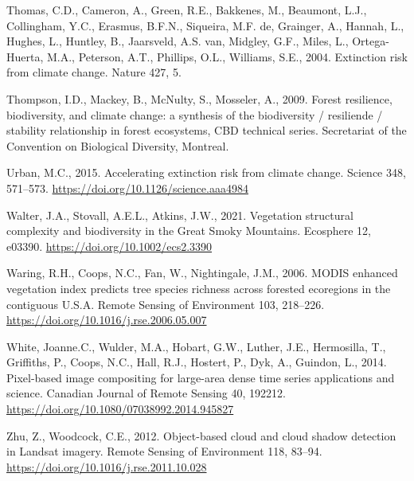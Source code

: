 \documentclass[
]{agujournal2019}
\newlength{\cslhangindent}
\newenvironment{CSLReferences}[2] %
 {\begin{list}{}{%
  \setlength{\itemindent}{0pt}
  \setlength{\leftmargin}{0pt}
  \setlength{\parsep}{0pt}
  \ifodd #1
   \setlength{\leftmargin}{\cslhangindent}
   \setlength{\itemindent}{-1\cslhangindent}
  \fi
  \setlength{\itemsep}{#2\baselineskip}}}
 {\end{list}}
\begin{document}
\begin{CSLReferences}{1}{0}
Thomas, C.D., Cameron, A., Green, R.E., Bakkenes, M., Beaumont, L.J.,
Collingham, Y.C., Erasmus, B.F.N., Siqueira, M.F. de, Grainger, A.,
Hannah, L., Hughes, L., Huntley, B., Jaarsveld, A.S. van, Midgley, G.F.,
Miles, L., Ortega-Huerta, M.A., Peterson, A.T., Phillips, O.L.,
Williams, S.E., 2004. Extinction risk from climate change. Nature 427,
5.

Thompson, I.D., Mackey, B., McNulty, S., Mosseler, A., 2009. Forest
resilience, biodiversity, and climate change: a synthesis of the
biodiversity / resiliende / stability relationship in forest ecosystems,
CBD technical series. Secretariat of the Convention on Biological
Diversity, Montreal.

Urban, M.C., 2015. Accelerating extinction risk from climate change.
Science 348, 571--573. \url{https://doi.org/10.1126/science.aaa4984}

Walter, J.A., Stovall, A.E.L., Atkins, J.W., 2021. Vegetation structural
complexity and biodiversity in the Great Smoky Mountains. Ecosphere 12,
e03390. \url{https://doi.org/10.1002/ecs2.3390}

Waring, R.H., Coops, N.C., Fan, W., Nightingale, J.M., 2006. MODIS
enhanced vegetation index predicts tree species richness across forested
ecoregions in the contiguous U.S.A. Remote Sensing of Environment 103,
218--226. \url{https://doi.org/10.1016/j.rse.2006.05.007}

White, Joanne.C., Wulder, M.A., Hobart, G.W., Luther, J.E., Hermosilla,
T., Griffiths, P., Coops, N.C., Hall, R.J., Hostert, P., Dyk, A.,
Guindon, L., 2014. Pixel-based image compositing for large-area dense
time series applications and science. Canadian Journal of Remote Sensing
40, 192212. \url{https://doi.org/10.1080/07038992.2014.945827}

Zhu, Z., Woodcock, C.E., 2012. Object-based cloud and cloud shadow
detection in Landsat imagery. Remote Sensing of Environment 118, 83--94.
\url{https://doi.org/10.1016/j.rse.2011.10.028}

\end{CSLReferences}
\end{document}
